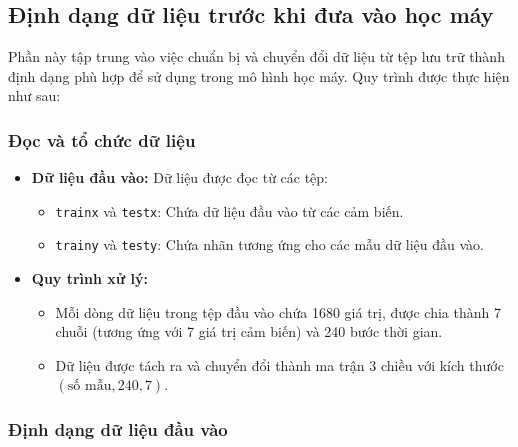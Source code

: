 \newpage
\subsection{Định dạng dữ liệu trước khi đưa vào học máy}

Phần này tập trung vào việc chuẩn bị và chuyển đổi dữ liệu từ tệp lưu trữ thành định dạng phù hợp để sử dụng trong mô hình học máy. Quy trình được thực hiện như sau:

\subsubsection{Đọc và tổ chức dữ liệu}

\begin{itemize}
    \item \textbf{Dữ liệu đầu vào:} Dữ liệu được đọc từ các tệp:
    \begin{itemize}
        \item \texttt{trainx} và \texttt{testx}: Chứa dữ liệu đầu vào từ các cảm biến.
        \item \texttt{trainy} và \texttt{testy}: Chứa nhãn tương ứng cho các mẫu dữ liệu đầu vào.
    \end{itemize}

    \item \textbf{Quy trình xử lý:}
    \begin{itemize}
        \item Mỗi dòng dữ liệu trong tệp đầu vào chứa 1680 giá trị, được chia thành 7 chuỗi (tương ứng với 7 giá trị cảm biến) và 240 bước thời gian.
        \item Dữ liệu được tách ra và chuyển đổi thành ma trận 3 chiều với kích thước $(\text{số mẫu}, 240, 7)$.
    \end{itemize}
\end{itemize}

\subsubsection{Định dạng dữ liệu đầu vào}


